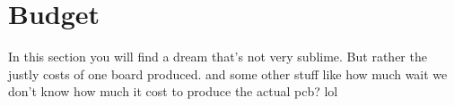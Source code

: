 \section{Budget} \label{section:budget}
In this section you will find a dream that's not very sublime.
But rather the justly costs of one board produced.
and some other stuff
like how much wait we don't know how much it cost to produce the actual pcb?
lol
